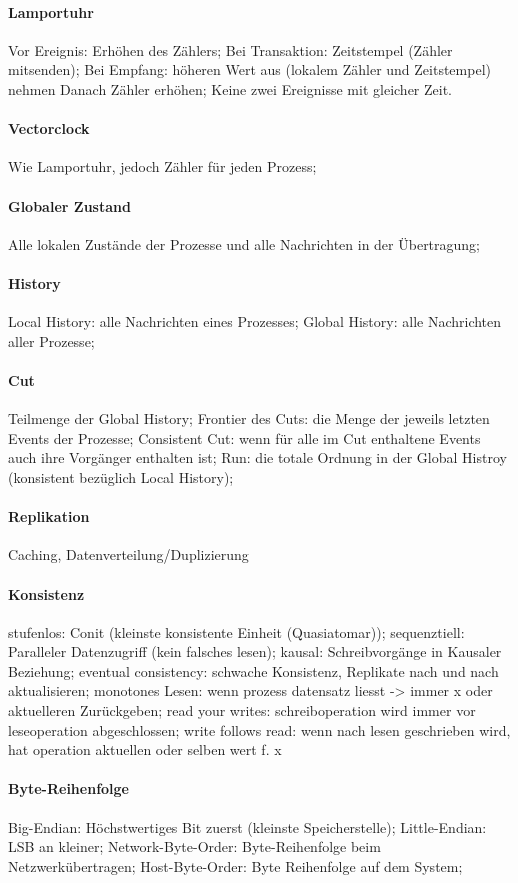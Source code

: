 \documentclass[pagesize,11pt,a4paper]{scrartcl}
\begin{document}
\paragraph*{Lamportuhr}
	Vor Ereignis: Erhöhen des Zählers;
	Bei Transaktion: Zeitstempel (Zähler mitsenden);
	Bei Empfang: höheren Wert aus (lokalem Zähler und Zeitstempel) nehmen Danach Zähler erhöhen;
	Keine zwei Ereignisse mit gleicher Zeit.

\paragraph*{Vectorclock}
	Wie Lamportuhr, jedoch Zähler für jeden Prozess;

\paragraph{Globaler Zustand}
	Alle lokalen Zustände der Prozesse und alle Nachrichten in der Übertragung;
	
	\paragraph*{History}
	Local History: alle Nachrichten eines Prozesses;
	Global History: alle Nachrichten aller Prozesse;
	
	\paragraph*{Cut}
	Teilmenge der Global History;
	Frontier des Cuts: die Menge der jeweils letzten Events der Prozesse;
	Consistent Cut: wenn für alle im Cut enthaltene Events auch ihre Vorgänger enthalten ist;
	Run: die totale Ordnung in der Global Histroy (konsistent bezüglich Local History);

\paragraph{Replikation}
	Caching, Datenverteilung/Duplizierung

\paragraph*{Konsistenz}
	stufenlos: Conit (kleinste konsistente Einheit (Quasiatomar));
	sequenztiell: Paralleler Datenzugriff (kein falsches lesen);
	kausal: Schreibvorgänge in Kausaler Beziehung;
	eventual consistency: schwache Konsistenz, Replikate nach und nach aktualisieren;
	monotones Lesen: wenn prozess datensatz liesst -> immer x oder aktuelleren Zurückgeben;
	read your writes: schreiboperation wird immer vor leseoperation abgeschlossen;
	write follows read: wenn nach lesen geschrieben wird, hat operation aktuellen oder selben wert f. x
	
\paragraph*{Byte-Reihenfolge}
	Big-Endian: Höchstwertiges Bit zuerst (kleinste Speicherstelle);
	Little-Endian: LSB an kleiner;
	Network-Byte-Order: Byte-Reihenfolge beim Netzwerkübertragen;
	Host-Byte-Order: Byte Reihenfolge auf dem System;
\end{document}
